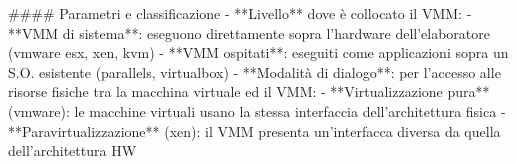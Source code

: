\documentclass[a4paper, 11pt, twoside, openright]{book}
\begin{document}
#### Parametri e classificazione
- **Livello** dove è collocato il VMM:
    - **VMM di sistema**: eseguono direttamente sopra l'hardware dell'elaboratore (vmware esx, xen, kvm)
    - **VMM ospitati**: eseguiti come applicazioni sopra un S.O. esistente (parallels, virtualbox)
- **Modalità di dialogo**: per l'accesso alle risorse fisiche tra la macchina virtuale ed il VMM:
    - **Virtualizzazione pura** (vmware): le macchine virtuali usano la stessa interfaccia 
    dell'architettura fisica
    - **Paravirtualizzazione** (xen): il VMM presenta un'interfacca diversa da quella dell'architettura HW
\end{document}
